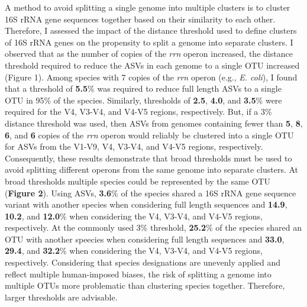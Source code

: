 \documentclass[
]{article}
\begin{document}
A method to avoid splitting a single genome into multiple clusters is to
cluster 16S rRNA gene sequences together based on their similarity to
each other. Therefore, I assessed the impact of the distance threshold
used to define clusters of 16S rRNA genes on the propensity to split a
genome into separate clusters. I observed that as the number of copies
of the \emph{rrn} operon increased, the distance threshold required to
reduce the ASVs in each genome to a single OTU increased (Figure 1).
Among species with 7 copies of the \emph{rrn} operon (e.g., \emph{E.
coli}), I found that a threshold of \textbf{5.5}\% was required to
reduce full length ASVs to a single OTU in 95\% of the species.
Similarly, thresholds of \textbf{2.5}, \textbf{4.0}, and \textbf{3.5}\%
were required for the V4, V3-V4, and V4-V5 regions, respectively. But,
if a 3\% distance threshold was used, then ASVs from genomes containing
fewer than \textbf{5}, \textbf{8}, \textbf{6}, and \textbf{6} copies of
the \emph{rrn} operon would reliably be clustered into a single OTU for
ASVs from the V1-V9, V4, V3-V4, and V4-V5 regions, respectively.
Consequently, these results demonstrate that broad thresholds must be
used to avoid splitting different operons from the same genome into
separate clusters. At broad thresholds multiple species could be
represented by the same OTU (\textbf{Figure 2}). Using ASVs,
\textbf{3.6}\% of the species shared a 16S rRNA gene sequence variant
with another species when considering full length sequences and
\textbf{14.9}, \textbf{10.2}, and \textbf{12.0}\% when considering the
V4, V3-V4, and V4-V5 regions, respectively. At the commonly used 3\%
threshold, \textbf{25.2}\% of the species shared an OTU with another
speecies when considering full length sequences and \textbf{33.0},
\textbf{29.4}, and \textbf{32.2}\% when considering the V4, V3-V4, and
V4-V5 regions, respectively. Considering that species designations are
unevenly applied and reflect multiple human-imposed biases, the risk of
splitting a genome into multiple OTUs more problematic than clustering
species together. Therefore, larger thresholds are advisable.
\end{document}
